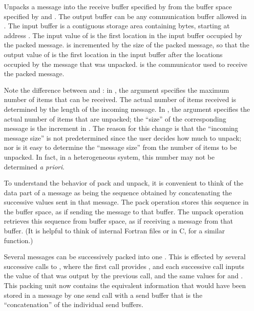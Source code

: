 Unpacks a message into the receive buffer specified by  from the buffer
space specified by  and .  The output buffer can
be any communication buffer allowed in .  The input
buffer is a contiguous storage area containing  bytes,
starting at address .
The input value of  is the first location in
the input buffer occupied by the packed message.
 is incremented
by the size of the packed message, so that the output value of
 is the first location in the input buffer
after the locations occupied by the message that was unpacked.
 is the communicator used to receive the packed message.

\begin{users}
Note the difference between  and :  in
, the  argument specifies the maximum
number of
items that can be received.  The actual number of items received is determined
by the length of the incoming message.  In , the
 argument specifies the actual number
of items that are unpacked;
the ``size'' of the corresponding message is the increment in
.
The reason for this change is that the ``incoming message size'' is not
predetermined since the user decides how much to unpack; nor is it easy to
determine
the ``message size'' from the number of items to be unpacked.  In fact, in a
heterogeneous system, this number may not be determined \emph{a priori}.
\end{users}

To understand the behavior of pack and unpack, it is convenient to think of the
data part of a message as being the sequence obtained by concatenating the
successive values sent in that message.   The pack operation stores this
sequence in the buffer space, as if sending the message to that buffer.  The
unpack operation retrieves this sequence from buffer space, as if receiving a
message from that buffer.  (It is helpful to think of internal Fortran files or
 in C, for a similar function.)

Several messages can be successively packed into one .
This
is effected by several successive  calls to ,
where the first
call provides , and each successive call inputs the value
of  that was output by the previous call, and the same values
for  and .   This packing unit
now contains
the equivalent information that would have been stored in a message by one send
call with a send buffer that is the ``concatenation'' of the individual send
buffers.

